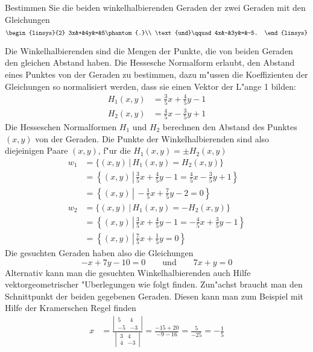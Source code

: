 Bestimmen Sie die beiden winkelhalbierenden Geraden der zwei Geraden
mit den Gleichungen
\[
\begin{linsys}{2}
3x&+&4y&=&5\phantom{.}\\
\text{und}\qquad 4x&-&3y&=&-5.
\end{linsys}
\]

\begin{loesung}
Die Winkelhalbierenden sind die Mengen der Punkte, die von beiden
Geraden den gleichen Abstand haben. Die Hessesche Normalform erlaubt,
den Abstand eines Punktes von der Geraden zu bestimmen, dazu m"ussen
die Koeffizienten der Gleichungen so normalisiert werden, dass sie
einen Vektor der L"ange 1 bilden:
\begin{align*}
H_1(x,y)&=\frac35x+\frac45y-1\\
H_2(x,y)&=\frac45x-\frac35y+1
\end{align*}
Die Hesseschen Normalformen $H_1$ und $H_2$ berechnen den Abstand
des Punktes $(x,y)$ von der Geraden. Die Punkte der Winkelhalbierenden
sind also diejeinigen Paare $(x,y)$, f"ur die $H_1(x,y)=\pm H_2(x,y)$
\begin{align*}
w_1
&=
\{(x,y)\,|\, H_1(x,y)=H_2(x,y)\}
\\
&=
\left\{(x,y)\,\left|\, 
\frac35x+\frac45y-1=\frac45x-\frac35y+1\right.\right\}
\\
&=
\left\{(x,y)\,\left|\,
-\frac15x+\frac75y-2=0
\right.\right\}
\\
w_2&=\{(x,y)\,|\, H_1(x,y)=-H_2(x,y)\}
\\
&=
\left\{(x,y)\,\left|\, 
\frac35x+\frac45y-1=-\frac45x+\frac35y-1\right.\right\}
\\
&=
\left\{(x,y)\,\left|\,
\frac75x+\frac15y=0
\right.\right\}
\end{align*}
Die gesuchten Geraden haben also die Gleichungen
\[
-x+7y-10=0
\qquad
\text{und}
\qquad
7x+y=0
\]
Alternativ kann man die gesuchten Winkelhalbierenden auch Hilfe
vektorgeometrischer "Uberlegungen wie folgt finden.
Zun"achst braucht man den Schnittpunkt der beiden gegebenen Geraden.
Diesen kann man zum Beispiel mit Hilfe der Kramerschen Regel
finden
\begin{align*}
x&=\frac{\left|\,\begin{matrix}5&4\\-5&-3\end{matrix}\,\right|}{\left|\,\begin{matrix}3&4\\4&-3\end{matrix}\,\right|}
=\frac{-15+20}{-9-16}=\frac{5}{-25}=-\frac15\\

\end{align*}
\end{loesung}
